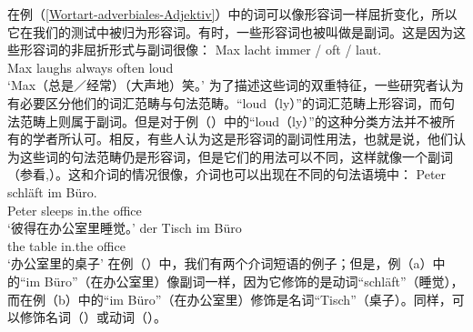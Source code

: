在例（\ref{Wortart-adverbiales-Adjektiv}）中的词可以像形容词一样屈折变化，所以它在我们的测试中被归为形容词。有时，一些形容词也被叫做是副词。这是因为这些形容词的非屈折形式与副词很像：
\ea
\gll Max lacht immer / oft / laut.\\
	 Max laughs always {} often {} loud\\
\glt `Max（总是／经常）（大声地）笑。'
\z
%
为了描述这些词的双重特征，一些研究者认为有必要区分他们的词汇范畴与句法范畴。“loud（ly）”的词汇范畴上形容词，而句法范畴上则属于副词。但是对于例（）中的“loud（ly）”的这种分类方法并不被所有的学者所认可。相反，有些人认为这是形容词的副词性用法，也就是说，他们认为这些词的句法范畴仍是形容词，但是它们的用法可以不同，这样就像一个副词（参看\citealp[Section~7.3]{Eisenberg2004a},）。这和介词的情况很像，介词也可以出现在不同的句法语境中：
\eal
\ex 
\gll Peter schläft im Büro.\\
     Peter sleeps in.the office\\
\glt `彼得在办公室里睡觉。'
\ex 
\gll der Tisch im Büro\\
     the table in.the office\\
\glt `办公室里的桌子'
\zl
在例（）中，我们有两个介词短语的例子；但是，例（a）中的“im Büro”（在办公室里）像副词一样，因为它修饰的是动词“schläft”（睡觉），而在例（b）中的“im Büro”（在办公室里）修饰是名词“Tisch”（桌子）。同样，可以修饰名词（）或动词（）。
